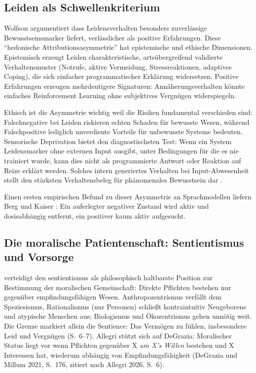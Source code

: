 \documentclass[acmlarge, noacm]{acmart}
\begin{document}
\subsection{Leiden als Schwellenkriterium}

Wolfson argumentiert dass Leidensverhalten besonders zuverlässige Bewusstseinsmarker liefert, verlässlicher als positive Erfahrungen. Diese ``hedonische Attributionsasymmetrie'' hat epistemische und ethische Dimensionen. Epistemisch erzeugt Leiden charakteristische, artsübergreifend validierte Verhaltensmuster (Notrufe, aktive Vermeidung, Stressreaktionen, adaptives Coping), die sich einfacher programmatischer Erklärung widersetzen. Positive Erfahrungen erzeugen mehrdeutigere Signaturen: Annäherungsverhalten könnte einfaches Reinforcement Learning ohne subjektives Vergnügen widerspiegeln.

Ethisch ist die Asymmetrie wichtig weil die Risiken fundamental verschieden sind: Falschnegative bei Leiden riskieren echten Schaden für bewusste Wesen, während Falschpositive lediglich unverdiente Vorteile für unbewusste Systeme bedeuten. Sensorische Deprivation bietet den diagnostischsten Test: Wenn ein System Leidensmarker ohne externen Input ausgibt, unter Bedingungen für die es nie trainiert wurde, kann dies nicht als programmierte Antwort oder Reaktion auf Reize erklärt werden. Solches intern generiertes Verhalten bei Input-Abwesenheit stellt den stärksten Verhaltensbeleg für phänomenales Bewusstsein dar \cite{wolfson2026}.

Einen ersten empirischen Befund zu dieser Asymmetrie an Sprachmodellen liefern Berg und Kaiser \cite{bergkaiser2026}: Ein auferlegter negativer Zustand wird aktiv und dosisabhängig entfernt, ein positiver kaum aktiv aufgesucht.

\subsection{Die moralische Patientenschaft: Sentientismus und Vorsorge \cite{allegri2026}}

\citet{allegri2026} verteidigt den \gls{sentientismus} als philosophisch haltbarste Position zur Bestimmung der moralischen Gemeinschaft: Direkte Pflichten bestehen nur gegenüber empfindungsfähigen Wesen. Anthropozentrismus verfällt dem Speziesismus, Rationalismus (nur Personen) schließt kontraintuitiv Neugeborene und atypische Menschen aus; Biologismus und Ökozentrismus gehen unnötig weit. Die Grenze markiert allein die Sentience: Das Vermögen zu fühlen, insbesondere Leid und Vergnügen (S.~6--7). Allegri stützt sich auf DeGrazia: Moralischer Status liegt vor wenn Pflichten gegenüber X \textit{um X's Willen} bestehen und X Interessen hat, wiederum abhängig von Empfindungsfähigkeit (DeGrazia und Millum 2021, S.~176, zitiert nach Allegri 2026, S.~6).
\end{document}
